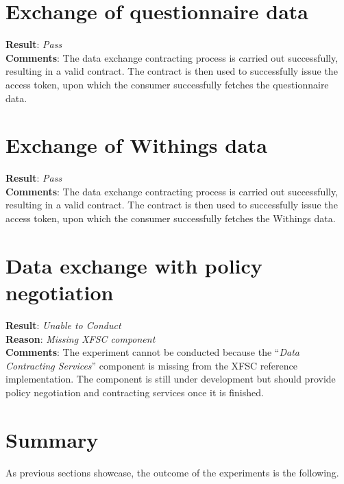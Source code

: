 \section{Exchange of questionnaire data}\label{sec:exchange-of-questionnaire-data}

\textbf{Result}: \textit{Pass}
\\
\textbf{Comments}: The data exchange contracting process is carried out successfully, resulting in a valid contract.
The contract is then used to successfully issue the access token, upon which the consumer successfully fetches the questionnaire data.

\section{Exchange of Withings data}\label{sec:exchange-of-withings-data}

\textbf{Result}: \textit{Pass}
\\
\textbf{Comments}: The data exchange contracting process is carried out successfully, resulting in a valid contract.
The contract is then used to successfully issue the access token, upon which the consumer successfully fetches the Withings data.

\section{Data exchange with policy negotiation}\label{sec:data-exchange-with-policy-negotiation}

\textbf{Result}: \textit{Unable to Conduct}
\\
\textbf{Reason}: \textit{Missing XFSC component}
\\
\textbf{Comments}: The experiment cannot be conducted because the ``\textit{Data Contracting Services}'' component is missing from the XFSC reference implementation.
The component is still under development but should provide policy negotiation and contracting services once it is finished.

\section{Summary}\label{sec:summary}

As previous sections showcase, the outcome of the experiments is the following.

